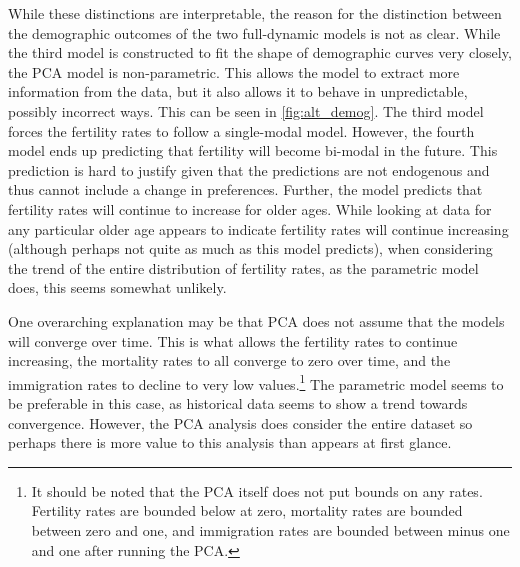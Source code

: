 \documentclass[10pt]{article}
\renewcommand{\thesection}{\arabic{section}}
\renewcommand{\thesubsection}{\thesection.\arabic{subsection}}
\renewcommand{\section}[2][]{\oldsection[#1]{#2}\index{#1}\label{sec:\thesection}}
\renewcommand{\subsection}[2][]{\oldsubsection[#1]{#2}\index{#1}\label{sec:\thesubsection}}
\numberwithin{equation}{subsection}
\begin{document}
\par While these distinctions are interpretable, the reason for the distinction between the demographic outcomes of the two full-dynamic models is not as clear. While the third model is constructed to fit the shape of demographic curves very closely, the PCA model is non-parametric. This allows the model to extract more information from the data, but it also allows it to behave in unpredictable, possibly incorrect ways. This can be seen in \autoref{fig:alt_demog}. The third model forces the fertility rates to follow a single-modal model. However, the fourth model ends up predicting that fertility will become bi-modal in the future. This prediction is hard to justify given that the predictions are not endogenous and thus cannot include a change in preferences. Further, the model predicts that fertility rates will continue to increase for older ages. While looking at data for any particular older age appears to indicate fertility rates will continue increasing (although perhaps not quite as much as this model predicts), when considering the trend of the entire distribution of fertility rates, as the parametric model does, this seems somewhat unlikely.

\par One overarching explanation may be that PCA does not assume that the models will converge over time. This is what allows the fertility rates to continue increasing, the mortality rates to all converge to zero over time, and the immigration rates to decline to very low values.\footnote{It should be noted that the PCA itself does not put bounds on any rates. Fertility rates are bounded below at zero, mortality rates are bounded between zero and one, and immigration rates are bounded between minus one and one after running the PCA.} The parametric model seems to be preferable in this case, as historical data seems to show a trend towards convergence. However, the PCA analysis does consider the entire dataset so perhaps there is more value to this analysis than appears at first glance.

\subsection{Steady-State}
\end{document}
